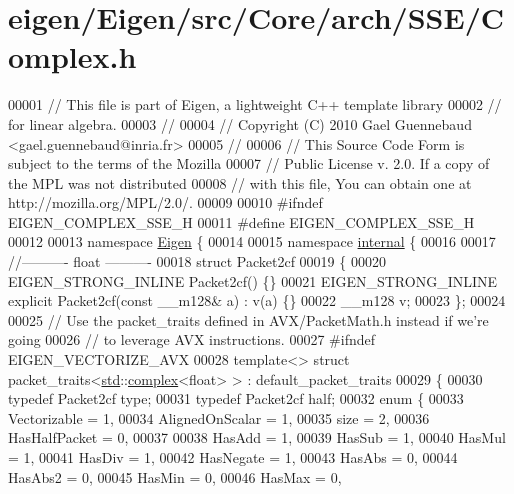 \hypertarget{eigen_2_eigen_2src_2_core_2arch_2_s_s_e_2_complex_8h_source}{}\section{eigen/\+Eigen/src/\+Core/arch/\+S\+S\+E/\+Complex.h}
\label{eigen_2_eigen_2src_2_core_2arch_2_s_s_e_2_complex_8h_source}

\begin{DoxyCode}
00001 \textcolor{comment}{// This file is part of Eigen, a lightweight C++ template library}
00002 \textcolor{comment}{// for linear algebra.}
00003 \textcolor{comment}{//}
00004 \textcolor{comment}{// Copyright (C) 2010 Gael Guennebaud <gael.guennebaud@inria.fr>}
00005 \textcolor{comment}{//}
00006 \textcolor{comment}{// This Source Code Form is subject to the terms of the Mozilla}
00007 \textcolor{comment}{// Public License v. 2.0. If a copy of the MPL was not distributed}
00008 \textcolor{comment}{// with this file, You can obtain one at http://mozilla.org/MPL/2.0/.}
00009 
00010 \textcolor{preprocessor}{#ifndef EIGEN\_COMPLEX\_SSE\_H}
00011 \textcolor{preprocessor}{#define EIGEN\_COMPLEX\_SSE\_H}
00012 
00013 \textcolor{keyword}{namespace }\hyperlink{namespace_eigen}{Eigen} \{
00014 
00015 \textcolor{keyword}{namespace }\hyperlink{namespaceinternal}{internal} \{
00016 
00017 \textcolor{comment}{//---------- float ----------}
00018 \textcolor{keyword}{struct }Packet2cf
00019 \{
00020   EIGEN\_STRONG\_INLINE Packet2cf() \{\}
00021   EIGEN\_STRONG\_INLINE \textcolor{keyword}{explicit} Packet2cf(\textcolor{keyword}{const} \_\_m128& a) : v(a) \{\}
00022   \_\_m128  v;
00023 \};
00024 
00025 \textcolor{comment}{// Use the packet\_traits defined in AVX/PacketMath.h instead if we're going}
00026 \textcolor{comment}{// to leverage AVX instructions.}
00027 \textcolor{preprocessor}{#ifndef EIGEN\_VECTORIZE\_AVX}
00028 \textcolor{keyword}{template}<> \textcolor{keyword}{struct }packet\_traits<\hyperlink{namespacestd}{std}::\hyperlink{structcomplex}{complex}<float> >  : default\_packet\_traits
00029 \{
00030   \textcolor{keyword}{typedef} Packet2cf type;
00031   \textcolor{keyword}{typedef} Packet2cf half;
00032   \textcolor{keyword}{enum} \{
00033     Vectorizable = 1,
00034     AlignedOnScalar = 1,
00035     size = 2,
00036     HasHalfPacket = 0,
00037 
00038     HasAdd    = 1,
00039     HasSub    = 1,
00040     HasMul    = 1,
00041     HasDiv    = 1,
00042     HasNegate = 1,
00043     HasAbs    = 0,
00044     HasAbs2   = 0,
00045     HasMin    = 0,
00046     HasMax    = 0,

\end{DoxyCode}
